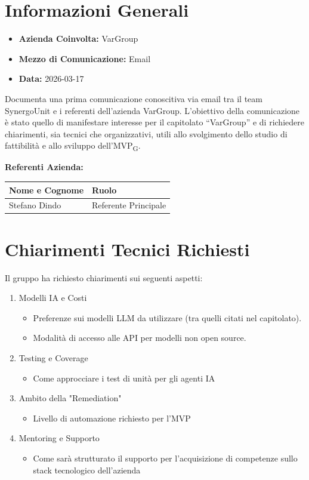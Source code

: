 \section{Informazioni Generali}
\begin{itemize}
	\item \textbf{Azienda Coinvolta:} {VarGroup}
	\item \textbf{Mezzo di Comunicazione:} {Email}
	\item \textbf{Data:} 2026-03-17
\end{itemize}
Documenta una prima comunicazione conoscitiva via email tra il team SynergoUnit e i referenti dell’azienda VarGroup.
L’obiettivo della comunicazione è stato quello di manifestare interesse per il capitolato “VarGroup” e di richiedere chiarimenti, sia tecnici che organizzativi, utili allo svolgimento dello studio di fattibilità e allo sviluppo dell’MVP\textsubscript{G}.

\vspace{0.5cm}
\textbf{Referenti Azienda:}
\begin{table}[ht]
	\centering
	\renewcommand{\arraystretch}{1.2}
	\begin{tabularx}{\textwidth}{X l}
		\toprule
		\textbf{Nome e Cognome} & \textbf{Ruolo} \\
		\midrule
		{Stefano Dindo} & {Referente Principale} \\
		\bottomrule
	\end{tabularx}
\end{table}

\section{Chiarimenti Tecnici Richiesti}
Il gruppo ha richiesto chiarimenti sui seguenti aspetti:
\begin{enumerate}
	\item Modelli IA e Costi
	\begin{itemize}
		\item Preferenze sui modelli LLM da utilizzare (tra quelli citati nel capitolato).
		\item Modalità di accesso alle API per modelli non open source.
	\end{itemize}
	\item Testing e Coverage
	\begin{itemize}
		\item Come approcciare i test di unità per gli agenti IA
	\end{itemize}
	\item Ambito della "Remediation"
	\begin{itemize}
		\item Livello di automazione richiesto per l'MVP
	\end{itemize}
	\item Mentoring e Supporto
	\begin{itemize}
		\item Come sarà strutturato il supporto per l'acquisizione di competenze sullo stack tecnologico dell'azienda
	\end{itemize}
\end{enumerate}



